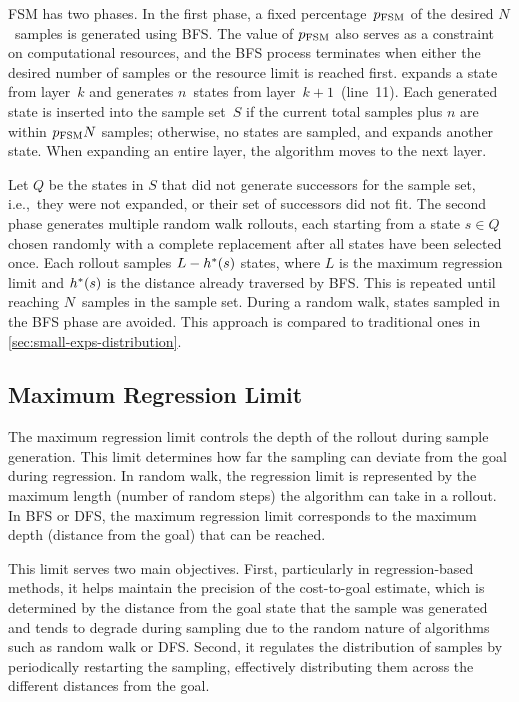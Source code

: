 FSM has two phases. In the first phase, a fixed percentage~$p_\text{FSM}$ of the desired $N$~samples is generated using BFS. The value of $p_\text{FSM}$ also serves as a constraint on computational resources, and the BFS process terminates when either the desired number of samples or the resource limit is reached first. \bfs expands a state from layer~$k$ and generates $n$~states from layer~$k+1$~(line~11). Each generated state is inserted into the sample set~$S$ if the current total samples plus $n$ are within $p_{\text{FSM}}N$ samples; otherwise, no states are sampled, and \bfs expands another state. When expanding an entire layer, the algorithm moves to the next layer.

Let $Q$ be the states in $S$ that did not generate successors for the sample set, i.e.,~they were not expanded, or their set of successors did not fit. The second phase generates multiple random walk rollouts, each starting from a state $s \in Q$ chosen randomly with a complete replacement after all states have been selected once. Each rollout samples $L-h^{*}(s)$ states, where $L$ is the maximum regression limit and $h^{*}(s)$ is the distance already traversed by BFS. This is repeated until reaching $N$~samples in the sample set. During a random walk, states sampled in the BFS phase are avoided. This approach is compared to traditional ones in \cref{sec:small-exps-distribution}.

\subsection{Maximum Regression Limit}
\label{sec:rollout-limit}

The maximum regression limit controls the depth of the rollout during sample generation. This limit determines how far the sampling can deviate from the goal during regression. In random walk, the regression limit is represented by the maximum length (number of random steps) the algorithm can take in a rollout. In BFS or DFS, the maximum regression limit corresponds to the maximum depth (distance from the goal) that can be reached.

This limit serves two main objectives. First, particularly in regression-based methods, it helps maintain the precision of the cost-to-goal estimate, which is determined by the distance from the goal state that the sample was generated and tends to degrade during sampling due to the random nature of algorithms such as random walk or DFS. Second, it regulates the distribution of samples by periodically restarting the sampling, effectively distributing them across the different distances from the goal.

